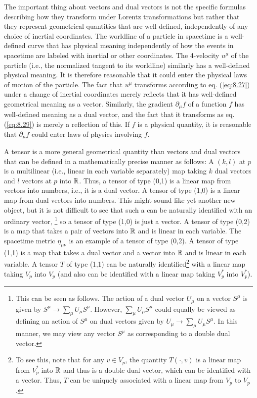   The important thing about vectors and dual vectors is not the specific formulas describing how they transform under Lorentz transformations but rather that they represent geometrical quantities that are well defined, independently of any choice of inertial coordinates. The worldline of a particle in spacetime is a well-defined curve that has physical meaning independently of how the events in spacetime are labeled with inertial or other coordinates. The 4-velocity $u^\mu$ of the particle (i.e., the normalized tangent to its worldline)  similarly has a well-defined physical meaning. It is therefore reasonable that it could enter the physical laws of motion of the particle. The fact that $u^\mu$ transforms according to eq. (\ref{eq:8.27}) under a change of inertial coordinates merely reflects that it has well-defined geometrical meaning as a vector. Similarly, the gradient $\partial_\mu f$ of a function $f$ has well-defined meaning as a dual vector, and the fact that it transforms as eq. (\ref{eq:8.29}) is merely a reflection of this. If $f$ is a physical quantity, it is reasonable that $\partial_\mu f$ could enter laws of physics involving $f$.
  
  A tensor is a more general geometrical quantity than vectors and dual vectors that can be defined in a mathematically precise manner as follows: A  $(k,l)$ at $p$ is a multilinear (i.e., linear in each variable separately) map taking $k$ dual vectors and $l$ vectors at $p$ into $\mathbb{R}$. Thus, a tensor of type (0,1) is a linear map from vectors into numbers, i.e., it is a dual vector. A tensor of type (1,0) is a linear map from dual vectors into numbers. This might sound like yet another new object, but it is not difficult to see that such a  can be naturally identified with an ordinary vector,
\footnote{This can be seen as follows. The action of a dual vector $U_\mu$ on a vector $S^\mu$ is given by 
$S^\mu \rightarrow \sum_\mu U_\mu S^\mu$. However, $\sum_\mu U_\mu S^\mu$ could equally be viewed as defining an action of $S^\mu$ on dual vectors given by $U_\mu \rightarrow \sum_\mu U_\mu S^\mu$. In this manner, we may view any vector $S^\mu$ as corresponding to a double dual vector.}
so a tensor of type (1,0) is just a vector. A tensor of type (0,2) is a map that takes a pair of vectors into $\mathbb{R}$ and is linear in each variable. The spacetime metric $\eta_{\mu\nu}$ is an example of a tensor of type (0,2). A tensor of type (1,1) is a map that takes a dual vector and a vector into $\mathbb{R}$ and is linear in each variable. A tensor $T$ of type (1,1) can be naturally identified\footnote{To see this, note that for any $v \in V_p$, the quantity $T(\cdot, v)$ is a linear map from $V^*_p$ into $\mathbb{R}$ and thus is a double dual vector, which can be identified with a vector. Thus, $T$ can be uniquely associated with a linear map from $V_p$ to $V_p$.}
with a linear map taking $V_p$ into $V_p$ (and also can be identified with a linear map taking $V^*_p$ into $V^*_p$).
  
